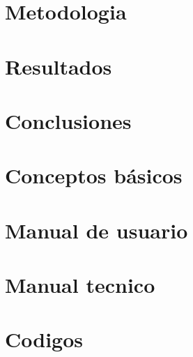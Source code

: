 \documentclass[10pt]{article}
\begin{document}

\newpage
\tableofcontents
\newpage
\section{Metodologia}

\newpage
\section{Resultados}

\newpage
\section{Conclusiones}

\section{Conceptos básicos}

\section{Manual de usuario}

\section{Manual tecnico}

\newpage
\section{Codigos}

\end{document}
